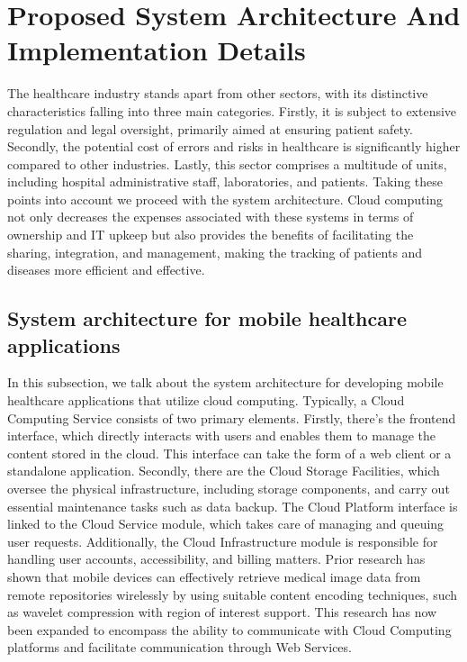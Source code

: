 \documentclass{article}
\begin{document}
\section{Proposed System Architecture And 
Implementation Details
} The healthcare industry stands apart from other sectors, with its distinctive characteristics falling into three main categories. Firstly, it is subject to extensive regulation and legal oversight, primarily aimed at ensuring patient safety. Secondly, the potential cost of errors and risks in healthcare is significantly higher compared to other industries. Lastly, this sector comprises a multitude of units, including hospital administrative staff, laboratories, and patients. Taking these points into account we proceed with the system architecture.
Cloud computing not only decreases the expenses associated with these systems in terms of ownership and IT upkeep but also provides the benefits of facilitating the sharing, integration, and management, making the tracking of patients and diseases more efficient and effective.
\subsection{
System architecture for mobile healthcare applications}
In this subsection, we talk about the system architecture for developing mobile healthcare applications that utilize cloud computing. Typically, a Cloud Computing Service consists of two primary elements. Firstly, there's the frontend interface, which directly interacts with users and enables them to manage the content stored in the cloud. This interface can take the form of a web client or a standalone application. Secondly, there are the Cloud Storage Facilities, which oversee the physical infrastructure, including storage components, and carry out essential maintenance tasks such as data backup. The Cloud Platform interface is linked to the Cloud Service module, which takes care of managing and queuing user requests. Additionally, the Cloud Infrastructure module is responsible for handling user accounts, accessibility, and billing matters. Prior research has shown that mobile devices can effectively retrieve medical image data from remote repositories wirelessly by using suitable content encoding techniques, such as wavelet compression with region of interest support. This research has now been expanded to encompass the ability to communicate with Cloud Computing platforms and facilitate communication through Web Services.
\end{document}
